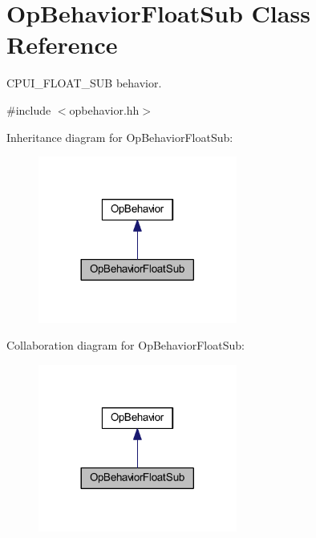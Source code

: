 \hypertarget{class_op_behavior_float_sub}{}\section{Op\+Behavior\+Float\+Sub Class Reference}
\label{class_op_behavior_float_sub}


C\+P\+U\+I\+\_\+\+F\+L\+O\+A\+T\+\_\+\+S\+UB behavior.  




{\ttfamily \#include $<$opbehavior.\+hh$>$}



Inheritance diagram for Op\+Behavior\+Float\+Sub\+:
\nopagebreak
\begin{figure}[H]
\begin{center}
\leavevmode
\includegraphics[width=185pt]{class_op_behavior_float_sub__inherit__graph}
\end{center}
\end{figure}


Collaboration diagram for Op\+Behavior\+Float\+Sub\+:
\nopagebreak
\begin{figure}[H]
\begin{center}
\leavevmode
\includegraphics[width=185pt]{class_op_behavior_float_sub__coll__graph}
\end{center}
\end{figure}
